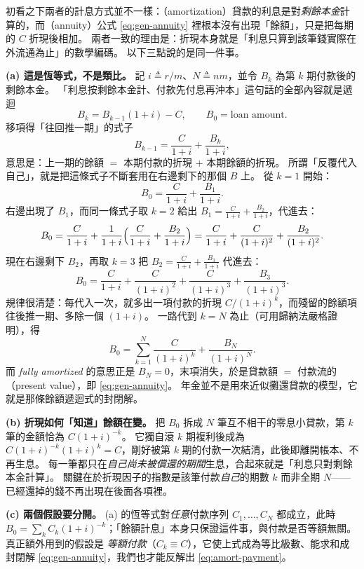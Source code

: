\begin{remark}
	初看之下兩者的計息方式並不一樣：（amortization）貸款的利息是對\emph{剩餘本金}計算的，而（annuity）公式 \eqref{eq:gen-annuity} 裡根本沒有出現「餘額」，只是把每期的 $C$ 折現後相加。
	兩者一致的理由是：折現本身就是「利息只算到該筆錢實際在外流通為止」的數學編碼。
	以下三點說的是同一件事。

	\textbf{(a) 這是恆等式，不是類比。
	} 記 $i \triangleq r/m$、$N \triangleq nm$，並令 $B_{k}$ 為第 $k$ 期付款後的剩餘本金。
	「利息按剩餘本金計、付款先付息再沖本」這句話的全部內容就是遞迴
	\[
		B_{k} = B_{k-1}(1+i) - C ,\qquad B_{0} = \text{loan amount} .
	\]
	移項得「往回推一期」的式子
	\[
		B_{k-1} = \frac{C}{1+i} + \frac{B_{k}}{1+i} ,
	\]
	意思是：上一期的餘額 $=$ 本期付款的折現 $+$ 本期餘額的折現。
	所謂「反覆代入自己」，就是把這條式子不斷套用在右邊剩下的那個 $B$ 上。
	從 $k=1$ 開始：
	\[
		B_{0} = \frac{C}{1+i} + \frac{B_{1}}{1+i} .
	\]
	右邊出現了 $B_{1}$，而同一條式子取 $k=2$ 給出 $B_{1} = \frac{C}{1+i} + \frac{B_{2}}{1+i}$，代進去：
	\[
		B_{0} = \frac{C}{1+i} + \frac{1}{1+i}\Bigl(\frac{C}{1+i} + \frac{B_{2}}{1+i}\Bigr)
		= \frac{C}{1+i} + \frac{C}{(1+i)^{2}} + \frac{B_{2}}{(1+i)^{2}} .
	\]
	現在右邊剩下 $B_{2}$，再取 $k=3$ 把 $B_{2} = \frac{C}{1+i} + \frac{B_{3}}{1+i}$ 代進去：
	\[
		B_{0} = \frac{C}{1+i} + \frac{C}{(1+i)^{2}} + \frac{C}{(1+i)^{3}} + \frac{B_{3}}{(1+i)^{3}} .
	\]
	規律很清楚：每代入一次，就多出一項付款的折現 $C/(1+i)^{k}$，而殘留的餘額項往後推一期、多除一個 $(1+i)$。
	一路代到 $k=N$ 為止（可用歸納法嚴格證明），得
	\[
		B_{0} = \sum_{k=1}^{N} \frac{C}{(1+i)^{k}} + \frac{B_{N}}{(1+i)^{N}} .
	\]
	而 \emph{fully amortized} 的意思正是 $B_{N} = 0$，末項消失，於是貸款額 $=$ 付款流的（present value），即 \eqref{eq:gen-annuity}。
	年金並不是用來近似攤還貸款的模型，它就是那條餘額遞迴式的封閉解。

	\textbf{(b) 折現如何「知道」餘額在變。
	} 把 $B_{0}$ 拆成 $N$ 筆互不相干的零息小貸款，第 $k$ 筆的金額恰為 $C(1+i)^{-k}$。
	它獨自滾 $k$ 期複利後成為 $C(1+i)^{-k}(1+i)^{k} = C$，剛好被第 $k$ 期的付款一次結清，此後即離開帳本、不再生息。
	每一筆都只在\emph{自己尚未被償還的期間}生息，合起來就是「利息只對剩餘本金計算」。
	關鍵在於折現因子的指數是該筆付款\emph{自己}的期數 $k$ 而非全期 $N$——已經還掉的錢不再出現在後面各項裡。

	\textbf{(c) 兩個假設要分開。
	} (a) 的恆等式對\emph{任意}付款序列 $C_{1},\dots,C_{N}$ 都成立，此時 $B_{0} = \sum_{k} C_{k}(1+i)^{-k}$；「餘額計息」本身只保證這件事，與付款是否等額無關。
	真正額外用到的假設是 \emph{等額付款}（$C_{k} \equiv C$），它使上式成為等比級數、能求和成封閉解 \eqref{eq:gen-annuity}，我們也才能反解出 \eqref{eq:amort-payment}。
\end{remark}
\suppend


